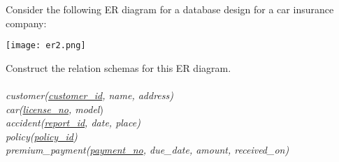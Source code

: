 \documentclass[a4 paper]{article}
\begin{document}
Consider the following ER diagram for a database design for a car insurance company:

\texttt{[image: er2.png]}

\noindent Construct the relation schemas for this ER diagram.\\\\
\textit{customer(\underline{customer\_id}, name, address)}\\
\textit{car(\underline{license\_no}, model})\\
\textit{accident(\underline{report\_id}, date, place)}\\
\textit{policy(\underline{policy\_id})}\\
\textit{premium\_payment(\underline{payment\_no}, due\_date, amount, received\_on)}
\end{document}
